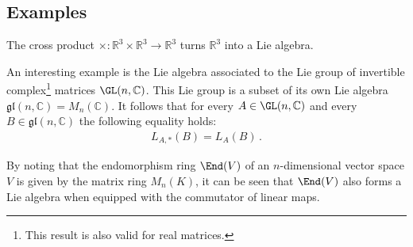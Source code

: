 \subsection{Examples}

    \begin{example}
        The cross product $\times:\mathbb{R}^3\times\mathbb{R}^3\rightarrow\mathbb{R}^3$ turns $\mathbb{R}^3$ into a Lie algebra.
    \end{example}
    \begin{example}
        An interesting example is the Lie algebra associated to the Lie group of invertible complex\footnote{This result is also valid for real matrices.} matrices $\GL(n,\mathbb{C})$. This Lie group is a subset of its own Lie algebra $\mathfrak{gl}(n,\mathbb{C}) = M_n(\mathbb{C})$. It follows that for every $A\in\GL(n,\mathbb{C})$ and every $B\in\mathfrak{gl}(n,\mathbb{C})$ the following equality holds:
        \begin{gather}
            L_{A,*}(B)=L_A(B)\,.
        \end{gather}
    \end{example}
    \begin{result}\label{lie:end_as_lie_algebra}
        By noting that the endomorphism ring $\End(V)$ of an $n$-dimensional vector space $V$ is given by the matrix ring $M_n(K)$, it can be seen that $\End(V)$ also forms a Lie algebra when equipped with the commutator of linear maps.
    \end{result}

